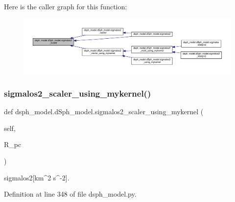 Here is the caller graph for this function\+:
\nopagebreak
\begin{figure}[H]
\begin{center}
\leavevmode
\includegraphics[width=350pt]{d0/d25/classdsph__model_1_1dSph__model_a05b988f7553121226a4d08369c44b4fa_icgraph}
\end{center}
\end{figure}
\mbox{\label{classdsph__model_1_1dSph__model_a14692f81c0bffc790d5daf7f4e6464c1}} 
\subsubsection{\texorpdfstring{sigmalos2\+\_\+scaler\+\_\+using\+\_\+mykernel()}{sigmalos2\_scaler\_using\_mykernel()}}
{\footnotesize\ttfamily def dsph\+\_\+model.\+d\+Sph\+\_\+model.\+sigmalos2\+\_\+scaler\+\_\+using\+\_\+mykernel (\begin{DoxyParamCaption}\item[{}]{self,  }\item[{}]{R\+\_\+pc }\end{DoxyParamCaption})}

\begin{DoxyVerb}sigmalos2[km^2 s^-2].
\end{DoxyVerb}
 

Definition at line 348 of file dsph\+\_\+model.\+py.



